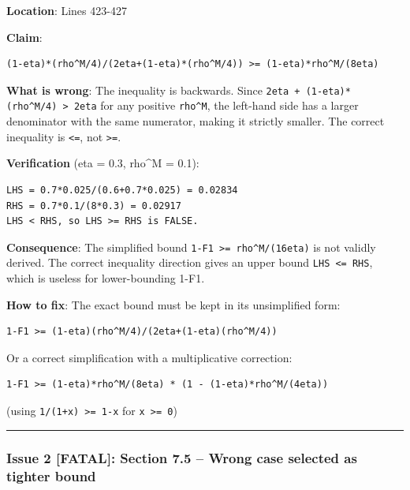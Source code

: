 \documentclass[
  12pt,
]{article}
\begin{document}
\textbf{Location}: Lines 423-427

\textbf{Claim}:

\begin{verbatim}
(1-eta)*(rho^M/4)/(2eta+(1-eta)*(rho^M/4)) >= (1-eta)*rho^M/(8eta)
\end{verbatim}

\textbf{What is wrong}: The inequality is backwards. Since
\texttt{2eta\ +\ (1-eta)*(rho\^{}M/4)\ \textgreater{}\ 2eta} for any
positive \texttt{rho\^{}M}, the left-hand side has a larger denominator
with the same numerator, making it strictly smaller. The correct
inequality is \texttt{\textless{}=}, not \texttt{\textgreater{}=}.

\textbf{Verification} (eta = 0.3, rho\^{}M = 0.1):

\begin{verbatim}
LHS = 0.7*0.025/(0.6+0.7*0.025) = 0.02834
RHS = 0.7*0.1/(8*0.3) = 0.02917
LHS < RHS, so LHS >= RHS is FALSE.
\end{verbatim}

\textbf{Consequence}: The simplified bound
\texttt{1-F1\ \textgreater{}=\ rho\^{}M/(16eta)} is not validly derived.
The correct inequality direction gives an upper bound
\texttt{LHS\ \textless{}=\ RHS}, which is useless for lower-bounding
1-F1.

\textbf{How to fix}: The exact bound must be kept in its unsimplified
form:

\begin{verbatim}
1-F1 >= (1-eta)(rho^M/4)/(2eta+(1-eta)(rho^M/4))
\end{verbatim}

Or a correct simplification with a multiplicative correction:

\begin{verbatim}
1-F1 >= (1-eta)*rho^M/(8eta) * (1 - (1-eta)*rho^M/(4eta))
\end{verbatim}

(using \texttt{1/(1+x)\ \textgreater{}=\ 1-x} for
\texttt{x\ \textgreater{}=\ 0})

\begin{center}\rule{0.5\linewidth}{0.5pt}\end{center}

\subsubsection{Issue 2 {[}FATAL{]}: Section 7.5 -- Wrong case selected
as tighter
bound}\label{issue-2-fatal-section-7.5-wrong-case-selected-as-tighter-bound}
\end{document}
